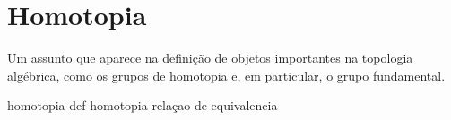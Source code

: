 \section{Homotopia}
\label{homotopia}
Um assunto que aparece na definição de objetos importantes na topologia algébrica, como os grupos de homotopia e, em particular, o grupo fundamental.

{homotopia-def}%
{homotopia-relaçao-de-equivalencia}                         

